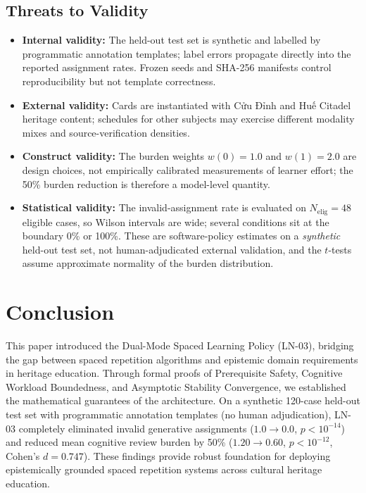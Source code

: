 \documentclass[11pt,a4paper]{article}
\begin{document}
\subsection{Threats to Validity}

\begin{itemize}[leftmargin=*]
    \item \textbf{Internal validity:} The held-out test set is synthetic and labelled by programmatic annotation templates; label errors propagate directly into the reported assignment rates. Frozen seeds and SHA-256 manifests control reproducibility but not template correctness.
    \item \textbf{External validity:} Cards are instantiated with Cửu Đỉnh and Huế Citadel heritage content; schedules for other subjects may exercise different modality mixes and source-verification densities.
    \item \textbf{Construct validity:} The burden weights $w(0)=1.0$ and $w(1)=2.0$ are design choices, not empirically calibrated measurements of learner effort; the 50\% burden reduction is therefore a model-level quantity.
    \item \textbf{Statistical validity:} The invalid-assignment rate is evaluated on $N_{\text{elig}}=48$ eligible cases, so Wilson intervals are wide; several conditions sit at the boundary 0\% or 100\%. These are software-policy estimates on a \emph{synthetic} held-out test set, not human-adjudicated external validation, and the $t$-tests assume approximate normality of the burden distribution.
\end{itemize}

\section{Conclusion}
\label{sec:conclusion}

This paper introduced the Dual-Mode Spaced Learning Policy (LN-03), bridging the gap between spaced repetition algorithms and epistemic domain requirements in heritage education. Through formal proofs of Prerequisite Safety, Cognitive Workload Boundedness, and Asymptotic Stability Convergence, we established the mathematical guarantees of the architecture. On a synthetic 120-case held-out test set with programmatic annotation templates (no human adjudication), LN-03 completely eliminated invalid generative assignments ($1.0 \to 0.0$, $p < 10^{-14}$) and reduced mean cognitive review burden by 50\% ($1.20 \to 0.60$, $p < 10^{-12}$, Cohen's $d = 0.747$). These findings provide robust foundation for deploying epistemically grounded spaced repetition systems across cultural heritage education.
\end{document}
